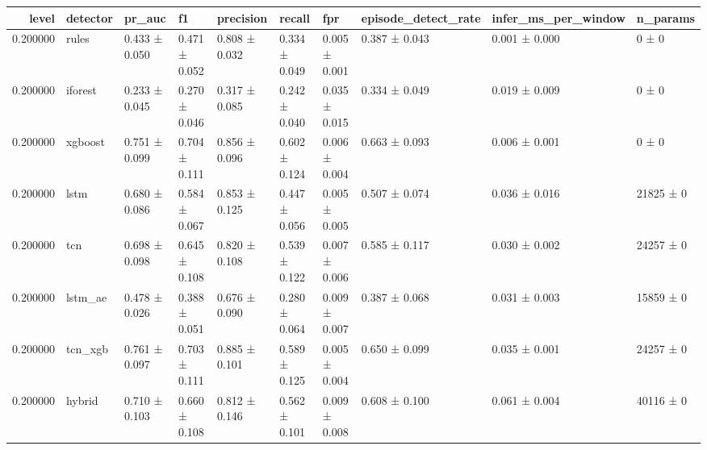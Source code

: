 \begin{tabular}{rlllllllll}
\toprule
level & detector & pr\_auc & f1 & precision & recall & fpr & episode\_detect\_rate & infer\_ms\_per\_window & n\_params \\
\midrule
0.200000 & rules & 0.433 ± 0.050 & 0.471 ± 0.052 & 0.808 ± 0.032 & 0.334 ± 0.049 & 0.005 ± 0.001 & 0.387 ± 0.043 & 0.001 ± 0.000 & 0 ± 0 \\
0.200000 & iforest & 0.233 ± 0.045 & 0.270 ± 0.046 & 0.317 ± 0.085 & 0.242 ± 0.040 & 0.035 ± 0.015 & 0.334 ± 0.049 & 0.019 ± 0.009 & 0 ± 0 \\
0.200000 & xgboost & 0.751 ± 0.099 & 0.704 ± 0.111 & 0.856 ± 0.096 & 0.602 ± 0.124 & 0.006 ± 0.004 & 0.663 ± 0.093 & 0.006 ± 0.001 & 0 ± 0 \\
0.200000 & lstm & 0.680 ± 0.086 & 0.584 ± 0.067 & 0.853 ± 0.125 & 0.447 ± 0.056 & 0.005 ± 0.005 & 0.507 ± 0.074 & 0.036 ± 0.016 & 21825 ± 0 \\
0.200000 & tcn & 0.698 ± 0.098 & 0.645 ± 0.108 & 0.820 ± 0.108 & 0.539 ± 0.122 & 0.007 ± 0.006 & 0.585 ± 0.117 & 0.030 ± 0.002 & 24257 ± 0 \\
0.200000 & lstm\_ae & 0.478 ± 0.026 & 0.388 ± 0.051 & 0.676 ± 0.090 & 0.280 ± 0.064 & 0.009 ± 0.007 & 0.387 ± 0.068 & 0.031 ± 0.003 & 15859 ± 0 \\
0.200000 & tcn\_xgb & 0.761 ± 0.097 & 0.703 ± 0.111 & 0.885 ± 0.101 & 0.589 ± 0.125 & 0.005 ± 0.004 & 0.650 ± 0.099 & 0.035 ± 0.001 & 24257 ± 0 \\
0.200000 & hybrid & 0.710 ± 0.103 & 0.660 ± 0.108 & 0.812 ± 0.146 & 0.562 ± 0.101 & 0.009 ± 0.008 & 0.608 ± 0.100 & 0.061 ± 0.004 & 40116 ± 0 \\
\bottomrule
\end{tabular}
